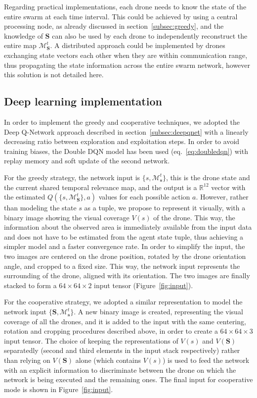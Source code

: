 \documentclass{article}
\begin{document}
Regarding practical implementations, each drone needs to know the state of the entire swarm at each time interval. This could be achieved by using a central processing node, as already discussed in section~\ref{subsec:greedy}, and the knowledge of $\mathbf{S}$ can also be used by each drone to independently reconstruct the entire map $\mathcal{M}_\mathbf{S}^t$. A distributed approach could be implemented by drones exchanging state vectors each other when they are within communication range, thus propagating the state information across the entire swarm network, however this solution is not detailed here.

\subsection{Deep learning implementation}
\label{subsec:deepimplementation}
In order to implement the greedy and cooperative techniques, we adopted the Deep Q-Network approach described in section~\ref{subsec:deepqnet} with a linearly decreasing ratio between exploration and exploitation steps.  In order to avoid training biases, the Double DQN model has been used (eq.~\ref{eq:doubledqn}) with replay memory and soft update of the second network. 

For the greedy strategy, the network input is $\{s, \mathcal{M}_\mathbf{s}^t\}$, this is the drone state and the current shared temporal relevance map, and the output is a $\mathbb{R}^{12}$ vector with the estimated $Q(\{s,\mathcal{M}_\mathbf{S}^t\}, a)$ values for each possible action $a$. However, rather than modeling the state $s$ as a tuple, we propose to represent it visually, with a binary image showing the visual coverage $V(s)$ of the drone. This way, the information about the observed area is immediately available from the input data and does not have to be estimated from the agent state tuple, thus achieving a simpler model and a faster convergence rate. In order to simplify the input, the two images are centered on the drone position, rotated by the drone orientation angle, and cropped to a fixed size. This way, the network input represents the surrounding of the drone, aligned with its orientation. The two images are finally stacked to form a $64\times 64\times 2$ input tensor (Figure~\ref{fig:input}).

For the cooperative strategy, we adopted a similar representation to model the network input $\{\mathbf{S}, \mathcal{M}_\mathbf{s}^t\}$. A new binary image is created, representing the visual coverage of all the drones, and it is added to the input with the same centering, rotation and cropping procedures described above, in order to create a $64\times 64\times 3$ input tensor. The choice of keeping the representations of $V(s)$ and $V(\mathbf{S})$ separatedly (second and third elements in the input stack respectively) rather than relying on  $V(\mathbf{S})$ alone (which contains $V(s)$) is used to feed the network with an explicit information to discriminate between the drone on which the network is being executed and the remaining ones. The final input for cooperative mode is shown in Figure~\ref{fig:input}.
\end{document}
